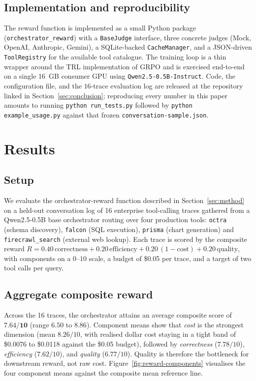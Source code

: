 \documentclass[10pt,twocolumn]{article}
\begin{document}
\subsection{Implementation and reproducibility}
\label{sec:experiments:repro}
The reward function is implemented as a small Python package (\texttt{orchestrator\_reward}) with a \texttt{BaseJudge} interface, three concrete judges (Mock, OpenAI, Anthropic, Gemini), a SQLite-backed \texttt{CacheManager}, and a JSON-driven \texttt{ToolRegistry} for the available tool catalogue. The training loop is a thin wrapper around the TRL implementation of GRPO and is exercised end-to-end on a single 16~GB consumer GPU using \texttt{Qwen2.5-0.5B-Instruct}. Code, the configuration file, and the $16$-trace evaluation log are released at the repository linked in Section~\ref{sec:conclusion}; reproducing every number in this paper amounts to running \texttt{python run\_tests.py} followed by \texttt{python example\_usage.py} against that frozen \texttt{conversation-sample.json}.


\section{Results}
\label{sec:results}

\subsection*{Setup}
We evaluate the orchestrator-reward function described in Section~\ref{sec:method} on a held-out conversation log of 16 enterprise tool-calling traces gathered from a Qwen2.5-0.5B base orchestrator routing over four production tools: \texttt{octra} (schema discovery), \texttt{falcon} (SQL execution), \texttt{prisma} (chart generation) and \texttt{firecrawl\_search} (external web lookup). Each trace is scored by the composite reward $R = 0.40\,\text{correctness} + 0.20\,\text{efficiency} + 0.20\,(1-\text{cost}) + 0.20\,\text{quality}$, with components on a $0\text{--}10$ scale, a budget of \$0.05 per trace, and a target of two tool calls per query.

\subsection*{Aggregate composite reward}
Across the 16 traces, the orchestrator attains an average composite score of $\mathbf{7.64/10}$ (range $6.50$ to $8.86$). Component means show that \emph{cost} is the strongest dimension (mean $8.26/10$, with realised dollar cost staying in a tight band of \$0.0076 to \$0.0118 against the \$0.05 budget), followed by \emph{correctness} ($7.78/10$), \emph{efficiency} ($7.62/10$), and \emph{quality} ($6.77/10$). Quality is therefore the bottleneck for downstream reward, not raw cost. Figure~\ref{fig:reward-components} visualises the four component means against the composite mean reference line.
\end{document}
